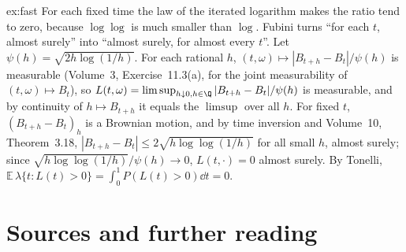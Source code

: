 \begin{solution}{ex:fast}
\idea For each fixed time the law of the iterated logarithm makes the ratio tend to zero, because $\log\log$ is much smaller than $\log$. Fubini turns ``for each $t$, almost surely'' into ``almost surely, for almost every $t$''.
\writeup Let $\psi(h)=\sqrt{2h\log(1/h)}$. For each rational $h$, $(t,\omega)\mapsto|B_{t+h}-B_t|/\psi(h)$ is measurable (Volume~3, Exercise~11.3(a), for the joint measurability of $(t,\omega)\mapsto B_t$), so
$L(t,\omega)=\limsup_{h\downarrow0,h\in\Q}|B_{t+h}-B_t|/\psi(h)$ is measurable, and by continuity of $h\mapsto B_{t+h}$ it equals the $\limsup$ over all $h$. For fixed $t$, $(B_{t+h}-B_t)_h$ is a Brownian motion,
and by time inversion and Volume~10, Theorem~3.18, $|B_{t+h}-B_t|\le2\sqrt{h\log\log(1/h)}$ for all small $h$, almost surely; since $\sqrt{h\log\log(1/h)}/\psi(h)\to0$, $L(t,\cdot)=0$ almost surely. By Tonelli,
$\mathbb E\,\lambda\{t:L(t)>0\}=\int_0^1P(L(t)>0)\dd t=0$.
\end{solution}

\section*{Sources and further reading}

